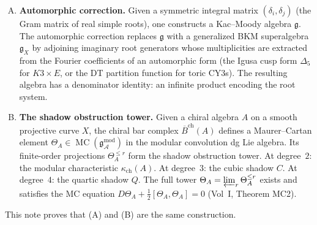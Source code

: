 \documentclass[11pt]{amsart}
\theoremstyle{definition}
\theoremstyle{remark}
\DeclareMathOperator{\MC}{MC}
\newcommand{\cA}{\mathcal{A}}
\newcommand{\barB}{\overline{B}}
\newcommand{\fg}{\mathfrak{g}}
\newcommand{\gmod}{\mathfrak{g}^{\mathrm{mod}}_\cA}
\begin{document}
\begin{enumerate}[(A)]
\item \textbf{Automorphic correction.}
 Given a symmetric integral matrix $(\delta_i, \delta_j)$
 (the Gram matrix of real simple roots), one constructs a
 Kac--Moody algebra $\fg$. The automorphic correction replaces
 $\fg$ with a generalized BKM superalgebra $\fg_X$ by adjoining
 imaginary root generators whose multiplicities are extracted from
 the Fourier coefficients of an automorphic form (the Igusa cusp
 form $\Delta_5$ for $K3 \times E$, or the DT partition function
 for toric CY3s). The resulting algebra has a denominator
 identity: an infinite product encoding the root system.

\item \textbf{The shadow obstruction tower.}
 Given a chiral algebra $A$ on a smooth projective curve $X$,
 the chiral bar complex $\barB^{\mathrm{ch}}(A)$ defines a
 Maurer--Cartan element
 $\Theta_A \in \MC(\gmod)$ in the modular convolution dg Lie
 algebra. Its finite-order projections
 $\Theta_A^{\leq r}$ form the shadow obstruction tower. At
 degree~$2$: the modular characteristic $\kappa_{\mathrm{ch}}(A)$. At
 degree~$3$: the cubic shadow $C$. At degree~$4$: the quartic
 shadow $Q$. The full tower
 $\Theta_A = \varprojlim_r \Theta_A^{\leq r}$ exists and
 satisfies the MC equation
 $D\Theta_A + \tfrac{1}{2}[\Theta_A, \Theta_A] = 0$
 (Vol~I, Theorem MC2).
\end{enumerate}

This note proves that (A) and (B) are the same construction.
\end{document}
